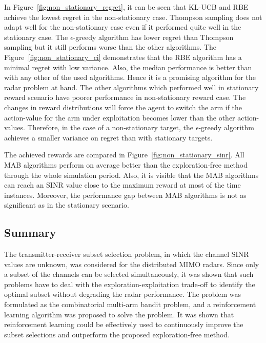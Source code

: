 \documentclass[english, 12pt, a4paper, elec, utf8, a-1b, online]{aaltothesis}
\begin{document}
In Figure~\ref{fig:non_stationary_regret}, it can be seen that KL-UCB and RBE achieve the lowest regret in the non-stationary case.
Thompson sampling does not adapt well for the non-stationary case even if it performed quite well in the stationary case.
The $\epsilon$-greedy algorithm has lower regret than Thompson sampling but it still performs worse than the other algorithms. 
The Figure~\ref{fig:non_stationary_ci} demonstrates that the RBE algorithm has a minimal regret with low variance.
Also, the median performance is better than with any other of the used algorithms.
Hence it is a promising algorithm for the radar problem at hand. 
The other algorithms which performed well in stationary reward scenario have poorer performance in non-stationary reward case.
The changes in reward distributions will force the agent to switch the arm if the action-value for the arm under exploitation becomes lower than the other action-values.
Therefore, in the case of a non-stationary target, the $\epsilon$-greedy algorithm achieves a smaller variance on regret than with stationary targets.

The achieved rewards are compared in Figure~\ref{fig:non_stationary_sinr}.
All MAB algorithms perform on average better than the exploration-free method through the whole simulation period.
Also, it is visible that the MAB algorithms can reach an SINR value close to the maximum reward at most of the time instances. 
Moreover, the performance gap between MAB algorithms is not as significant as in the stationary scenario.

\subsection{Summary}
\label{sec:tx_rx_summary}

The transmitter-receiver subset selection problem, in which the channel SINR values are unknown, was considered for the distributed MIMO radars.
Since only a subset of the channels can be selected simultaneously, it was shown that such problems have to deal with the exploration-exploitation trade-off to identify the optimal subset without degrading the radar performance.
The problem was formulated as the combinatorial multi-arm bandit problem, and a reinforcement learning algorithm was proposed to solve the problem.
It was shown that reinforcement learning could be effectively used to continuously improve the subset selections and outperform the proposed exploration-free method.
\end{document}
